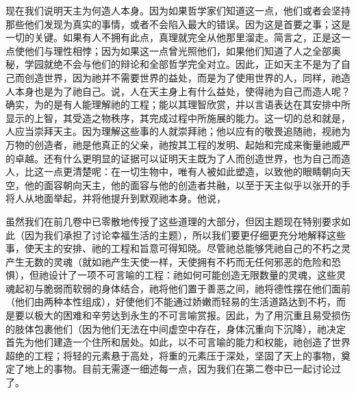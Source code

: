 现在我们说明天主为何造人本身。因为如果哲学家们知道这一点，他们或者会坚持那些他们发现为真实的事情，或者不会陷入最大的错误。因为这是首要之事；这是一切的关键。如果有人不拥有此点，真理就完全从他那里溜走。简言之，正是这一点使他们与理性相悖；因为如果这一点曾光照他们，如果他们知道了人之全部奥秘，学园就绝不会与他们的辩论和全部哲学完全对立。因此，正如天主不是为了自己而创造世界，因为祂并不需要世界的益处，而是为了使用世界的人，同样，祂造人本身也是为了祂自己。说，人在天主身上有什么益处，使得祂为自己而造人呢？确实，为的是有人能理解祂的工程；能以其理智欣赏，并以言语表达在其安排中所显示的上智，其受造之物秩序，其完成过程中所施展的能力。这一切的总和就是，人应当崇拜天主。因为理解这些事的人就崇拜祂；他以应有的敬畏追随祂，视祂为万物的创造者，祂是他真正的父亲，祂按其工程的发明、起始和完成来衡量祂威严的卓越。还有什么更明显的证据可以证明天主既为了人而创造世界，也为自己而造人，比这一点更清楚呢：在一切生物中，唯有人被如此塑造，以致他的眼睛朝向天空，他的面容朝向天主，他的面容与他的创造者共融，以至于天主似乎以张开的手将人从地面举起，并将他提升到默观祂本身。他说，\par

虽然我们在前几卷中已零散地传授了这些道理的大部分，但因主题现在特别要求如此（因为我们承担了讨论幸福生活的主题），所以我们要更仔细更充分地解释这些事，使天主的安排、祂的工程和旨意可得知晓。尽管祂总能够凭祂自己的不朽之灵产生无数的灵魂（就如祂产生天使一样，天使拥有不朽而无任何邪恶的危险和恐惧），但祂设计了一项不可言喻的工程：祂如何可能创造无限数量的灵魂，这些灵魂起初与脆弱而软弱的身体结合，祂将他们置于善恶之间，祂将德性摆在他们面前（他们由两种本性组成），好使他们不能通过娇嫩而轻易的生活道路达到不朽，而是要以极大的困难和辛劳达到永生的不可言喻赏报。因此，为了用沉重且易受损伤的肢体包裹他们（因为他们无法在中间虚空中存在，身体沉重向下沉降），祂决定首先为他们建造一个住所和居处。如此，以不可言喻的能力和权能，祂创造了世界超绝的工程；将轻的元素悬于高处，将重的元素压于深处，坚固了天上的事物，奠定了地上的事物。目前无需逐一细述每一点，因为我们在第二卷中已一起讨论过了。\par

